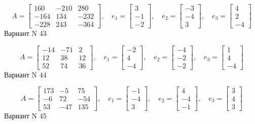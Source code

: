 \documentclass[11pt]{report}
\begin{document}
$$A = \left[\begin{matrix}160 & -210 & 280\\-164 & 134 & -232\\-228 & 243 & -364\end{matrix}\right],\quad e_1 = \left[\begin{matrix}3\\-1\\-2\end{matrix}\right],\quad e_2 = \left[\begin{matrix}-3\\-4\\3\end{matrix}\right],\quad e_3 = \left[\begin{matrix}4\\2\\-4\end{matrix}\right]$$Вариант N 43

$$A = \left[\begin{matrix}-14 & -71 & 2\\12 & 38 & 12\\52 & 74 & 36\end{matrix}\right],\quad e_1 = \left[\begin{matrix}-2\\4\\-4\end{matrix}\right],\quad e_2 = \left[\begin{matrix}-4\\-2\\-2\end{matrix}\right],\quad e_3 = \left[\begin{matrix}1\\4\\-4\end{matrix}\right]$$Вариант N 44

$$A = \left[\begin{matrix}173 & -5 & 75\\-6 & 72 & -54\\53 & -47 & 135\end{matrix}\right],\quad e_1 = \left[\begin{matrix}-1\\-4\\3\end{matrix}\right],\quad e_2 = \left[\begin{matrix}4\\-4\\-1\end{matrix}\right],\quad e_3 = \left[\begin{matrix}3\\4\\3\end{matrix}\right]$$Вариант N 45
\end{document}
